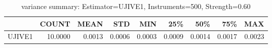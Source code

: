 \begin{table}[ht]
\centering
\caption{variance summary: Estimator=UJIVE1, Instruments=500, Strength=0.60}
\begin{tabular}{lrrrrrrrr}
\toprule
 & COUNT & MEAN & STD & MIN & 25\% & 50\% & 75\% & MAX \\
\midrule
UJIVE1 & 10.0000 & 0.0013 & 0.0006 & 0.0003 & 0.0009 & 0.0014 & 0.0017 & 0.0023 \\
\bottomrule
\end{tabular}
\end{table}
